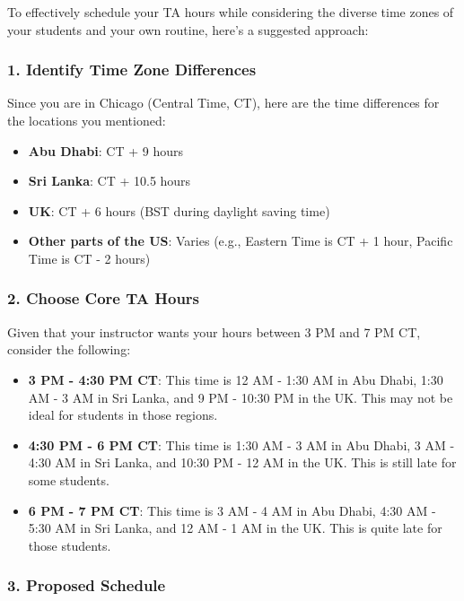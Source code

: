 \begin{botresponse}

To effectively schedule your TA hours while considering the diverse time zones of your students and your own routine, here’s a suggested approach:

\subsubsection{1. \textbf{Identify Time Zone Differences}}

Since you are in Chicago (Central Time, CT), here are the time differences for the locations you mentioned:

\begin{itemize}
\item \textbf{Abu Dhabi}: CT + 9 hours
\item \textbf{Sri Lanka}: CT + 10.5 hours
\item \textbf{UK}: CT + 6 hours (BST during daylight saving time)
\item \textbf{Other parts of the US}: Varies (e.g., Eastern Time is CT + 1 hour, Pacific Time is CT - 2 hours)
\end{itemize}

\subsubsection{2. \textbf{Choose Core TA Hours}}

Given that your instructor wants your hours between 3 PM and 7 PM CT, consider the following:

\begin{itemize}
\item \textbf{3 PM - 4:30 PM CT}: This time is 12 AM - 1:30 AM in Abu Dhabi, 1:30 AM - 3 AM in Sri Lanka, and 9 PM - 10:30 PM in the UK. This may not be ideal for students in those regions.
\item \textbf{4:30 PM - 6 PM CT}: This time is 1:30 AM - 3 AM in Abu Dhabi, 3 AM - 4:30 AM in Sri Lanka, and 10:30 PM - 12 AM in the UK. This is still late for some students.
\item \textbf{6 PM - 7 PM CT}: This time is 3 AM - 4 AM in Abu Dhabi, 4:30 AM - 5:30 AM in Sri Lanka, and 12 AM - 1 AM in the UK. This is quite late for those students.
\end{itemize}

\subsubsection{3. \textbf{Proposed Schedule}}


\end{botresponse}
